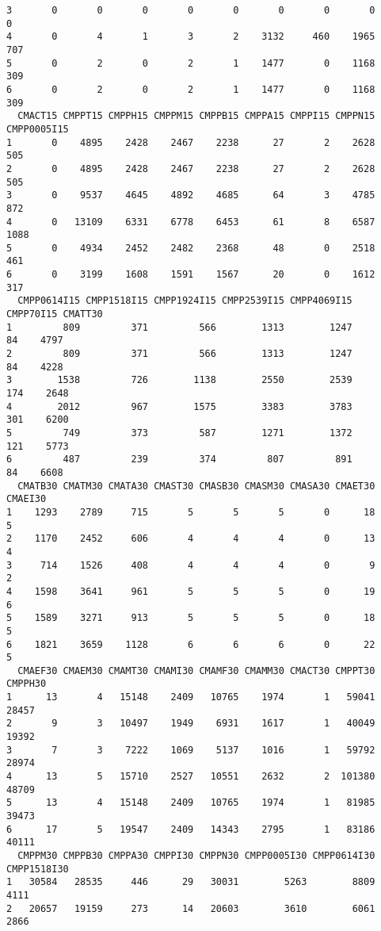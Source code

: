 \documentclass[
  letterpaper,
  DIV=11,
  numbers=noendperiod]{scrreprt}
\begin{document}
\begin{verbatim}
3       0       0       0       0       0       0       0       0       0
4       0       4       1       3       2    3132     460    1965     707
5       0       2       0       2       1    1477       0    1168     309
6       0       2       0       2       1    1477       0    1168     309
  CMACT15 CMPPT15 CMPPH15 CMPPM15 CMPPB15 CMPPA15 CMPPI15 CMPPN15 CMPP0005I15
1       0    4895    2428    2467    2238      27       2    2628         505
2       0    4895    2428    2467    2238      27       2    2628         505
3       0    9537    4645    4892    4685      64       3    4785         872
4       0   13109    6331    6778    6453      61       8    6587        1088
5       0    4934    2452    2482    2368      48       0    2518         461
6       0    3199    1608    1591    1567      20       0    1612         317
  CMPP0614I15 CMPP1518I15 CMPP1924I15 CMPP2539I15 CMPP4069I15 CMPP70I15 CMATT30
1         809         371         566        1313        1247        84    4797
2         809         371         566        1313        1247        84    4228
3        1538         726        1138        2550        2539       174    2648
4        2012         967        1575        3383        3783       301    6200
5         749         373         587        1271        1372       121    5773
6         487         239         374         807         891        84    6608
  CMATB30 CMATM30 CMATA30 CMAST30 CMASB30 CMASM30 CMASA30 CMAET30 CMAEI30
1    1293    2789     715       5       5       5       0      18       5
2    1170    2452     606       4       4       4       0      13       4
3     714    1526     408       4       4       4       0       9       2
4    1598    3641     961       5       5       5       0      19       6
5    1589    3271     913       5       5       5       0      18       5
6    1821    3659    1128       6       6       6       0      22       5
  CMAEF30 CMAEM30 CMAMT30 CMAMI30 CMAMF30 CMAMM30 CMACT30 CMPPT30 CMPPH30
1      13       4   15148    2409   10765    1974       1   59041   28457
2       9       3   10497    1949    6931    1617       1   40049   19392
3       7       3    7222    1069    5137    1016       1   59792   28974
4      13       5   15710    2527   10551    2632       2  101380   48709
5      13       4   15148    2409   10765    1974       1   81985   39473
6      17       5   19547    2409   14343    2795       1   83186   40111
  CMPPM30 CMPPB30 CMPPA30 CMPPI30 CMPPN30 CMPP0005I30 CMPP0614I30 CMPP1518I30
1   30584   28535     446      29   30031        5263        8809        4111
2   20657   19159     273      14   20603        3610        6061        2866

\end{verbatim}
\end{document}
